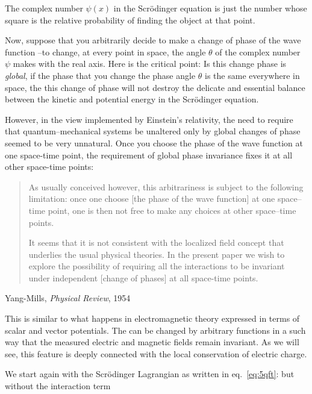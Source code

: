 The complex number $\psi(x)$ in the Scrödinger equation is just the number whose square is the relative probability of finding the object at that point.

Now, suppose that you arbitrarily decide to make a change of phase of the wave function --to change, at every point in space, the angle $\theta$ of the complex number $\psi$ makes with the real axis. Here is the critical point: Is this change phase is \emph{global}, if the phase that you change the phase angle $\theta$ is the same everywhere in space, the this change of phase will not destroy the delicate and essential balance between the kinetic and potential energy in the Scrödinger equation.

However, in the view implemented by Einstein's relativity, the need to require that quantum--mechanical systems be unaltered only by global changes of phase seemed to be very unnatural. Once you choose the phase of the wave function at one space-time point, the requirement of global phase invariance fixes it at all other space-time points:


  \begin{quote}
\small
    As usually conceived however, this arbitrariness is subject to the following  limitation: once one choose [the phase of the wave function] at one space--time point, one is then not free to make any choices at other space--time points.

It seems that it is not consistent with the localized field concept that underlies the usual physical theories. In the present paper we wish to explore the possibility of requiring all the interactions to be invariant under independent [change of phases] at all space-time points.
  \end{quote}
  \begin{flushright}
    Yang-Mills, \emph{Physical Review}, 1954
  \end{flushright}

This is similar to what happens in electromagnetic theory expressed in terms of scalar and vector potentials. The can be changed by arbitrary functions in a such way that the measured electric and magnetic fields remain invariant. As we will see, this feature is deeply connected with the local conservation of electric charge. 

We start again with the Scrödinger Lagrangian as written in eq.~\eqref{eq:5qft}: but without the interaction term


